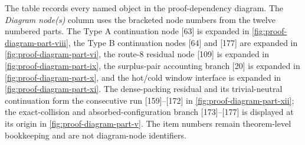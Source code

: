 \documentclass[11pt]{article}
\begin{document}
The table records every named object in the proof-dependency diagram.  The \emph{Diagram node(s)} column uses the bracketed node numbers from the twelve numbered parts.  The Type A continuation node [63] is expanded in \cref{fig:proof-diagram-part-viii}, the Type B continuation nodes [64] and [177] are expanded in \cref{fig:proof-diagram-part-vi}, the route-8 residual node [109] is expanded in \cref{fig:proof-diagram-part-ix}, the surplus-pair accounting branch [20] is expanded in \cref{fig:proof-diagram-part-x}, and the hot/cold window interface is expanded in \cref{fig:proof-diagram-part-xi}.  The dense-packing residual and its trivial-neutral continuation form the consecutive run [159]--[172] in \cref{fig:proof-diagram-part-xii}; the exact-collision and absorbed-configuration branch [173]--[177] is displayed at its origin in \cref{fig:proof-diagram-part-v}.  The item numbers remain theorem-level bookkeeping and are not diagram-node identifiers.
\end{document}
